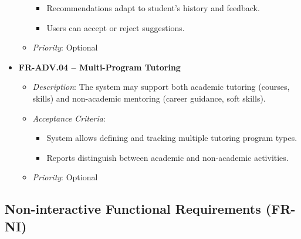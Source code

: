 \begin{itemize}
\begin{itemize}
\begin{itemize}
                    \item Recommendations adapt to student’s history and feedback.
                    \item Users can accept or reject suggestions.
                \end{itemize} 
            \item \textit{Priority}: Optional
        \end{itemize}
    \item \textbf{FR-ADV.04 – Multi-Program Tutoring}
        \begin{itemize}
            \item \textit{Description}: The system may support both academic tutoring (courses, skills) and non-academic mentoring (career guidance, soft skills).
            \item \textit{Acceptance Criteria}:
                \begin{itemize}
                    \item System allows defining and tracking multiple tutoring program types.
                    \item Reports distinguish between academic and non-academic activities.
                \end{itemize} 
            \item \textit{Priority}: Optional
        \end{itemize}
\end{itemize}


\subsection{Non-interactive Functional Requirements (FR-NI)}

